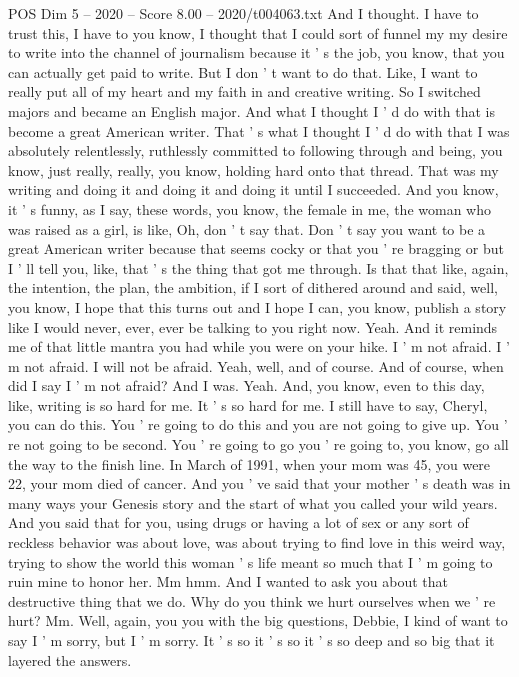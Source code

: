 \begin{textsample}{POS Dim 5 – 2020 – Score 8.00 – 2020/t004063.txt}
And I thought.
I have to trust this, I have to you know, I thought that I could sort of funnel my my desire to write into the channel of journalism because it ' s the job, you know, that you can actually get paid to write.
But I don ' t want to do that.
Like, I want to really put all of my heart and my faith in and creative writing.
So I switched majors and became an English major.
And what I thought I ' d do with that is become a great American writer.
That ' s what I thought I ' d do with that I was absolutely relentlessly, ruthlessly committed to following through and being, you know, just really, really, you know, holding hard onto that thread.
That was my writing and doing it and doing it and doing it until I succeeded.
And you know, it ' s funny, as I say, these words, you know, the female in me, the woman who was raised as a girl, is like, Oh, don ' t say that.
Don ' t say you want to be a great American writer because that seems cocky or that you ' re bragging or but I ' ll tell you, like, that ' s the thing that got me through.
Is that that like, again, the intention, the plan, the ambition, if I sort of dithered around and said, well, you know, I hope that this turns out and I hope I can, you know, publish a story like I would never, ever, ever be talking to you right now.
Yeah.
And it reminds me of that little mantra you had while you were on your hike.
I ' m not afraid.
I ' m not afraid.
I will not be afraid.
Yeah, well, and of course.
And of course, when did I say I ' m not afraid?
And I was.
Yeah.
And, you know, even to this day, like, writing is so hard for me.
It ' s so hard for me.
I still have to say, Cheryl, you can do this.
You ' re going to do this and you are not going to give up.
You ' re not going to be second.
You ' re going to go you ' re going to, you know, go all the way to the finish line.
In March of 1991, when your mom was 45, you were 22, your mom died of cancer.
And you ' ve said that your mother ' s death was in many ways your Genesis story and the start of what you called your wild years.
And you said that for you, using drugs or having a lot of sex or any sort of reckless behavior was about love, was about trying to find love in this weird way, trying to show the world this woman ' s life meant so much that I ' m going to ruin mine to honor her.
Mm hmm.
And I wanted to ask you about that destructive thing that we do.
Why do you think we hurt ourselves when we ' re hurt?
Mm.
Well, again, you you with the big questions, Debbie, I kind of want to say I ' m sorry, but I ' m sorry.
It ' s so it ' s so it ' s so deep and so big that it layered the answers.

\end{textsample}
